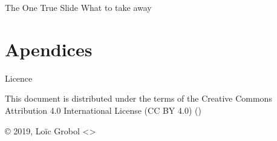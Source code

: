 \documentclass[hyperref={unicode}, xcolor={svgnames}, french]{beamer}
\title{\titlepagetitle}
\author{\myname}
\institute{\mylab}
\date{\conference\\\confplace, \confdate}
\begin{document}

\begin{frame}[plain]
	\titlepage
\end{frame}


\begin{frame}{The One True Slide}
	What to take away
\end{frame}


\appendix
\section{Apendices}

\begin{frame}{Licence}
	\begin{center}
		{\huge \ccby}
		\vfill
		This document is distributed under the terms of the Creative Commons Attribution 4.0 International License (CC BY 4.0) ()

		\vfill
		© 2019, Loïc Grobol <>

	\end{center}
\end{frame}
\end{document}
